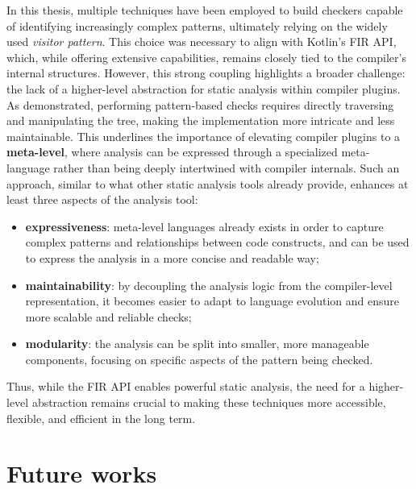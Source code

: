 \documentclass[12pt,a4paper,openright,twoside]{book}
\begin{document}
In this thesis, multiple techniques have been employed to build checkers capable
of identifying increasingly complex patterns, ultimately relying on the widely
used \emph{visitor pattern}. This choice was necessary to align with Kotlin's
\ac{FIR} API, which, while offering extensive capabilities, remains closely
tied to the compiler's internal structures. 
%
However, this strong coupling highlights a broader challenge: the lack of a
higher-level abstraction for static analysis within compiler plugins. As
demonstrated, performing pattern-based checks requires directly traversing and
manipulating the tree, making the implementation more intricate and less
maintainable. This underlines the importance of elevating compiler plugins to a
\textbf{meta-level}, where analysis can be expressed through a specialized
meta-language rather than being deeply intertwined with compiler internals. 
%
Such an approach, similar to what other static analysis tools already provide,
enhances at least three aspects of the analysis tool:
\begin{itemize}
  \item \textbf{expressiveness}: meta-level languages already exists in order
  to capture complex patterns and relationships between code constructs, and
  can be used to express the analysis in a more concise and readable way;
  \item \textbf{maintainability}: by decoupling the analysis logic from the
  compiler-level representation, it becomes easier to adapt to language 
  evolution and ensure more scalable and reliable checks;
  \item \textbf{modularity}: the analysis can be split into smaller, more
  manageable components, focusing on specific aspects of the pattern 
  being checked. 
\end{itemize}

Thus, while the \ac{FIR} API enables powerful static analysis, the need for a
higher-level abstraction remains crucial to making these techniques more
accessible, flexible, and efficient in the long term.

\section{Future works}
\end{document}
